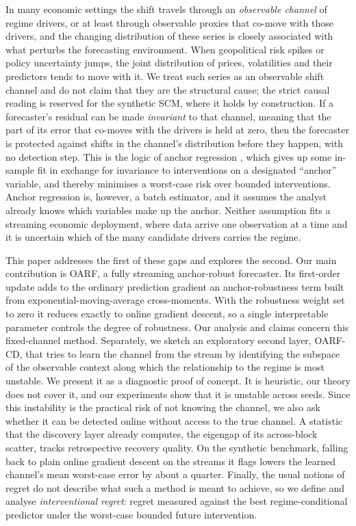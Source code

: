 \documentclass[11pt]{article}
\theoremstyle{plain}
\theoremstyle{remark}
\newcommand{\OARF}{\textsc{OARF}}
\newcommand{\OARFCD}{\textsc{OARF-CD}}
\begin{document}
In many economic settings the shift travels through an \emph{observable channel}
of regime drivers, or at least through observable proxies that co-move with those
drivers, and the changing distribution of these series is closely associated with
what perturbs the forecasting environment. When geopolitical risk spikes or policy
uncertainty jumps, the joint distribution of prices, volatilities and their
predictors tends to move with it. We treat such series as an observable shift
channel and do not claim that they are the structural cause; the strict causal
reading is reserved for the synthetic SCM, where it holds by construction. If a
forecaster's residual can be made \emph{invariant} to that channel, meaning that
the part of its error that co-moves with the drivers is held at zero, then the
forecaster is protected against shifts in the channel's distribution before they
happen, with no detection step. This is the logic of anchor regression
\citep{rothenhausler2021anchor}, which gives up some in-sample fit in exchange for
invariance to interventions on a designated ``anchor'' variable, and thereby
minimises a worst-case risk over bounded interventions. Anchor regression is,
however, a batch estimator, and it assumes the analyst already knows which
variables make up the anchor. Neither assumption fits a streaming economic
deployment, where data arrive one observation at a time and it is uncertain
which of the many candidate drivers carries the regime.

This paper addresses the first of these gaps and explores the second. Our main
contribution is \OARF{}, a fully streaming anchor-robust forecaster. Its
first-order update adds to the ordinary prediction gradient an anchor-robustness
term built from exponential-moving-average cross-moments. With the robustness
weight set to zero it reduces exactly to online gradient descent, so a single
interpretable parameter controls the degree of robustness. Our analysis and
claims concern this fixed-channel method. Separately, we sketch an exploratory
second layer, \OARFCD{}, that tries to learn the channel from the stream by
identifying the subspace of the observable context along which the relationship
to the regime is most unstable. We present it as a diagnostic proof of concept. It
is heuristic, our theory does not cover it, and our experiments show that it is
unstable across seeds. Since this instability is the practical risk of not knowing
the channel, we also ask whether it can be detected online without access to the
true channel. A statistic that the discovery layer already computes, the eigengap
of its across-block scatter, tracks retrospective recovery quality. On the
synthetic benchmark, falling back to plain online gradient descent on the streams
it flags lowers the learned channel's mean worst-case error by about a quarter.
Finally, the usual notions of regret do not describe what such a
method is meant to achieve, so we define and analyse \emph{interventional regret}:
regret measured against the best regime-conditional predictor under the worst-case
bounded future intervention.
\end{document}
